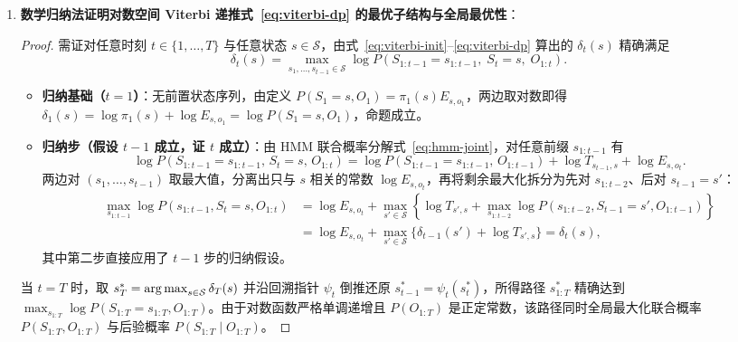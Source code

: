 \begin{enumerate}[label=(\arabic*), leftmargin=1.8em]
\begin{proof}
  \textbf{上界 $\mathrm{ESS} \le M$}：对向量 $\mathbf{w} = (w_1, \dots, w_M)$ 与全 $1$ 向量 $\mathbf{1} = (1, \dots, 1)$ 应用 Cauchy--Schwarz 不等式：
  \[
    \left(\sum_{m=1}^{M} w_m \cdot 1\right)^2 \le \left(\sum_{m=1}^{M} w_m^2\right)\left(\sum_{m=1}^{M} 1^2\right) = M \sum_{m=1}^{M} w_m^2.
  \]
  两边同除以 $\sum_{m=1}^{M} w_m^2 > 0$，即得 $\mathrm{ESS} \le M$。等号成立当且仅当 $\mathbf{w}$ 与 $\mathbf{1}$ 线性相关，即\textbf{$w_1 = w_2 = \dots = w_M > 0$}（所有样本等权，无任何权重退化）。
  \end{proof}
  \item \textbf{数学归纳法证明对数空间 Viterbi 递推式~\eqref{eq:viterbi-dp} 的最优子结构与全局最优性}：
  \begin{proof}
  需证对任意时刻 $t \in \{1, \dots, T\}$ 与任意状态 $s \in \mathcal{S}$，由式~\eqref{eq:viterbi-init}--\eqref{eq:viterbi-dp} 算出的 $\delta_t(s)$ 精确满足
  \[
    \delta_t(s) = \max_{s_1, \dots, s_{t-1} \in \mathcal{S}} \log P(S_{1:t-1} = s_{1:t-1},\; S_t = s,\; O_{1:t}).
  \]
  \begin{itemize}
    \item \textbf{归纳基础（$t = 1$）}：无前置状态序列，由定义 $P(S_1 = s, O_1) = \pi_1(s) E_{s, o_1}$，两边取对数即得 $\delta_1(s) = \log \pi_1(s) + \log E_{s, o_1} = \log P(S_1 = s, O_1)$，命题成立。
    \item \textbf{归纳步（假设 $t-1$ 成立，证 $t$ 成立）}：由 HMM 联合概率分解式~\eqref{eq:hmm-joint}，对任意前缀 $s_{1:t-1}$ 有
    \[
      \log P(S_{1:t-1} = s_{1:t-1},\, S_t = s,\, O_{1:t})
      = \log P(S_{1:t-1} = s_{1:t-1},\, O_{1:t-1}) + \log T_{s_{t-1}, s} + \log E_{s, o_t}.
    \]
    两边对 $(s_1, \dots, s_{t-1})$ 取最大值，分离出只与 $s$ 相关的常数 $\log E_{s, o_t}$，再将剩余最大化拆分为先对 $s_{1:t-2}$、后对 $s_{t-1} = s'$：
    \begin{align*}
      \max_{s_{1:t-1}} \log P(s_{1:t-1}, S_t=s, O_{1:t})
      &= \log E_{s, o_t} + \max_{s' \in \mathcal{S}} \left\{\log T_{s', s} + \max_{s_{1:t-2}} \log P(s_{1:t-2}, S_{t-1}=s', O_{1:t-1})\right\} \\
      &= \log E_{s, o_t} + \max_{s' \in \mathcal{S}} \big\{\delta_{t-1}(s') + \log T_{s', s}\big\}
      = \delta_t(s),
    \end{align*}
    其中第二步直接应用了 $t-1$ 步的归纳假设。
  \end{itemize}
  当 $t = T$ 时，取 $s_T^* = \operatorname*{arg\,max}_{s \in \mathcal{S}} \delta_T(s)$ 并沿回溯指针 $\psi_t$ 倒推还原 $s_{t-1}^* = \psi_t(s_t^*)$，所得路径 $s_{1:T}^*$ 精确达到 $\max_{s_{1:T}} \log P(S_{1:T}=s_{1:T}, O_{1:T})$。由于对数函数严格单调递增且 $P(O_{1:T})$ 是正定常数，该路径同时全局最大化联合概率 $P(S_{1:T}, O_{1:T})$ 与后验概率 $P(S_{1:T} \mid O_{1:T})$。
  \end{proof}
\end{enumerate}

